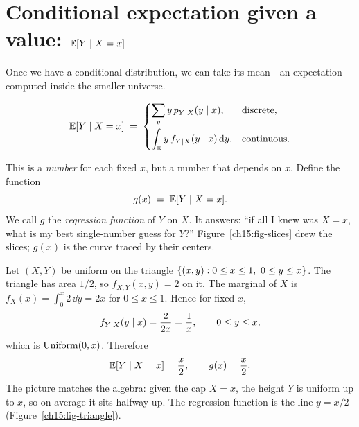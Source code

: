 \section{Conditional expectation given a value: \texorpdfstring{$\operatorname{\mathbb{E}}[Y \mid X = x]$}{E[Y|X=x]}}
\label{ch15:cond-exp-value}

Once we have a conditional distribution, we can take its mean---an expectation computed inside the smaller universe.

\begin{definition}[Conditional expectation given $X = x$]
\label{ch15:def-cond-exp-value}
\[
  \operatorname{\mathbb{E}}[Y \mid X = x] \;=\;
  \begin{cases}
    \displaystyle\sum_y y \, p_{Y\mid X}(y \mid x), & \text{discrete},\\[1.2em]
    \displaystyle\int_{\mathbb{R}} y \, f_{Y\mid X}(y \mid x)\,\mathrm{d} y, & \text{continuous}.
  \end{cases}
\]
\end{definition}

This is a \emph{number} for each fixed $x$, but a number that depends on $x$. Define the function
\[
  g(x) \;=\; \operatorname{\mathbb{E}}[Y \mid X = x].
\]
We call $g$ the \emph{regression function} of $Y$ on $X$. It answers: ``if all I knew was $X = x$,
what is my best single-number guess for $Y$?'' Figure~\ref{ch15:fig-slices} drew the slices; $g(x)$ is
the curve traced by their centers.

\begin{example}
\label{ch15:ex-triangle}
Let $(X,Y)$ be uniform on the triangle $\{(x,y) : 0 \le x \le 1,\ 0 \le y \le x\}$. The triangle has
area $1/2$, so $f_{X,Y}(x,y) = 2$ on it. The marginal of $X$ is
$f_X(x) = \int_0^x 2 \,\dd y = 2x$ for $0 \le x \le 1$. Hence for fixed $x$,
\[
  f_{Y\mid X}(y \mid x) = \frac{2}{2x} = \frac{1}{x}, \qquad 0 \le y \le x,
\]
which is $\operatorname{Uniform}(0,x)$. Therefore
\[
  \operatorname{\mathbb{E}}[Y \mid X = x] = \frac{x}{2}, \qquad g(x) = \frac{x}{2}.
\]
The picture matches the algebra: given the cap $X = x$, the height $Y$ is uniform up to $x$, so on
average it sits halfway up. The regression function is the line $y = x/2$ (Figure~\ref{ch15:fig-triangle}).
\end{example}

